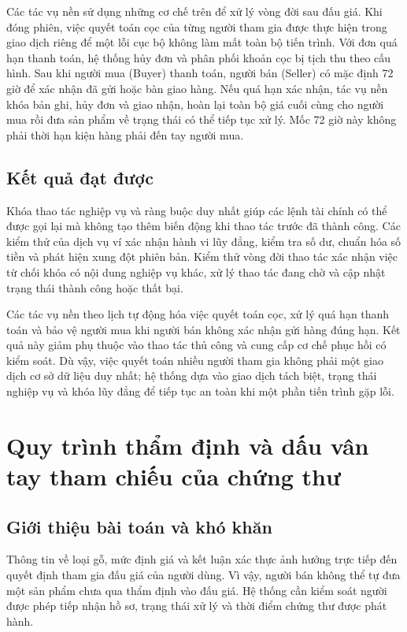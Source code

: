 \documentclass[../DoAn.tex]{subfiles}
\begin{document}
Các tác vụ nền sử dụng những cơ chế trên để xử lý vòng đời sau đấu giá. Khi đóng phiên, việc quyết toán cọc của từng người tham gia được thực hiện trong giao dịch riêng để một lỗi cục bộ không làm mất toàn bộ tiến trình. Với đơn quá hạn thanh toán, hệ thống hủy đơn và phân phối khoản cọc bị tịch thu theo cấu hình. Sau khi người mua (Buyer) thanh toán, người bán (Seller) có mặc định 72 giờ để xác nhận đã gửi hoặc bàn giao hàng. Nếu quá hạn xác nhận, tác vụ nền khóa bản ghi, hủy đơn và giao nhận, hoàn lại toàn bộ giá cuối cùng cho người mua rồi đưa sản phẩm về trạng thái có thể tiếp tục xử lý. Mốc 72 giờ này không phải thời hạn kiện hàng phải đến tay người mua.

\subsection{Kết quả đạt được}

Khóa thao tác nghiệp vụ và ràng buộc duy nhất giúp các lệnh tài chính có thể được gọi lại mà không tạo thêm biến động khi thao tác trước đã thành công. Các kiểm thử của dịch vụ ví xác nhận hành vi lũy đẳng, kiểm tra số dư, chuẩn hóa số tiền và phát hiện xung đột phiên bản. Kiểm thử vòng đời thao tác xác nhận việc từ chối khóa có nội dung nghiệp vụ khác, xử lý thao tác đang chờ và cập nhật trạng thái thành công hoặc thất bại.

Các tác vụ nền theo lịch tự động hóa việc quyết toán cọc, xử lý quá hạn thanh toán và bảo vệ người mua khi người bán không xác nhận gửi hàng đúng hạn. Kết quả này giảm phụ thuộc vào thao tác thủ công và cung cấp cơ chế phục hồi có kiểm soát. Dù vậy, việc quyết toán nhiều người tham gia không phải một giao dịch cơ sở dữ liệu duy nhất; hệ thống dựa vào giao dịch tách biệt, trạng thái nghiệp vụ và khóa lũy đẳng để tiếp tục an toàn khi một phần tiến trình gặp lỗi.

\section{Quy trình thẩm định và dấu vân tay tham chiếu của chứng thư}
\label{sec:appraisal-integrity-fingerprint}

\subsection{Giới thiệu bài toán và khó khăn}

Thông tin về loại gỗ, mức định giá và kết luận xác thực ảnh hưởng trực tiếp đến quyết định tham gia đấu giá của người dùng. Vì vậy, người bán không thể tự đưa một sản phẩm chưa qua thẩm định vào đấu giá. Hệ thống cần kiểm soát người được phép tiếp nhận hồ sơ, trạng thái xử lý và thời điểm chứng thư được phát hành.
\end{document}
